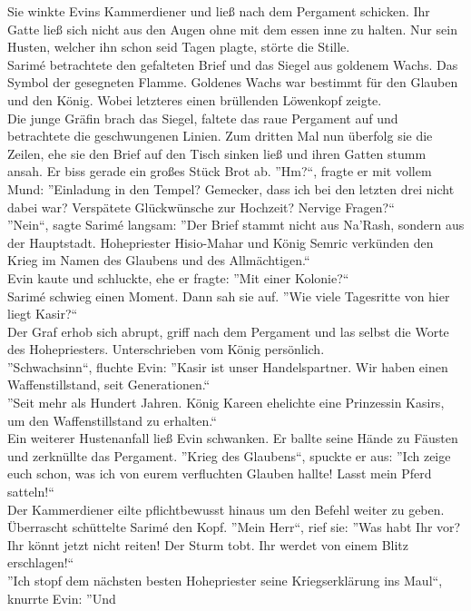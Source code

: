 Sie winkte Evins Kammerdiener und ließ nach dem Pergament schicken. Ihr Gatte ließ sich nicht aus 
den Augen ohne mit dem essen inne zu halten. Nur sein Husten, welcher ihn schon seid Tagen plagte, 
störte die Stille.\\
Sarimé betrachtete den gefalteten Brief und das Siegel aus goldenem Wachs. Das Symbol der 
gesegneten Flamme. Goldenes Wachs war bestimmt für den Glauben und den König. Wobei letzteres 
einen brüllenden Löwenkopf zeigte.\\
Die junge Gräfin brach das Siegel, faltete das raue Pergament auf und betrachtete die geschwungenen 
Linien. Zum dritten Mal nun überfolg sie die Zeilen, ehe sie den Brief auf den Tisch sinken ließ 
und ihren Gatten stumm ansah. Er biss gerade ein großes Stück Brot ab. ''Hm?``, fragte er mit 
vollem Mund: ''Einladung in den Tempel? Gemecker, dass ich bei den letzten drei nicht dabei war? 
Verspätete Glückwünsche zur Hochzeit? Nervige Fragen?``\\
''Nein``, sagte Sarimé langsam: ''Der Brief stammt nicht aus Na'Rash, sondern aus der Hauptstadt. 
Hohepriester Hisio-Mahar und König Semric verkünden den Krieg im Namen des Glaubens und des 
Allmächtigen.``\\
Evin kaute und schluckte, ehe er fragte: ''Mit einer Kolonie?``\\
Sarimé schwieg einen Moment. Dann sah sie auf. ''Wie viele Tagesritte von hier liegt Kasir?``\\
Der Graf erhob sich abrupt, griff nach dem Pergament und las selbst die Worte des Hohepriesters. 
Unterschrieben vom König persönlich.\\
''Schwachsinn``, fluchte Evin: ''Kasir ist unser Handelspartner. Wir haben einen Waffenstillstand, 
seit Generationen.``\\
''Seit mehr als Hundert Jahren. König Kareen ehelichte eine Prinzessin Kasirs, um den 
Waffenstillstand zu erhalten.``\\
Ein weiterer Hustenanfall ließ Evin schwanken. Er ballte seine Hände zu Fäusten und zerknüllte das 
Pergament. ''Krieg des Glaubens``, spuckte er aus: ''Ich zeige euch schon, was ich von eurem 
verfluchten Glauben hallte! Lasst mein Pferd satteln!``\\
Der Kammerdiener eilte pflichtbewusst hinaus um den Befehl weiter zu geben. Überrascht schüttelte 
Sarimé den Kopf. ''Mein Herr``, rief sie: ''Was habt Ihr vor? Ihr könnt jetzt nicht reiten! Der 
Sturm tobt. Ihr werdet von einem Blitz erschlagen!``\\
''Ich stopf dem nächsten besten Hohepriester seine Kriegserklärung ins Maul``, knurrte Evin: ''Und 
